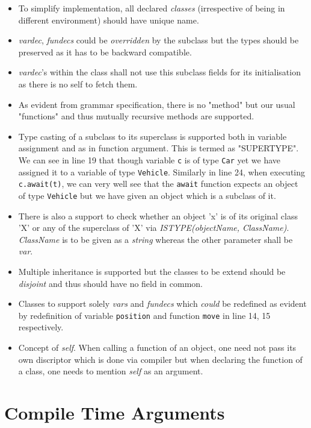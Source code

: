 \begin{itemize}
	\item To simplify implementation, all declared \textit{classes} (irrespective of being in different environment) should have unique name.
	\item \textit{vardec}, \textit{fundecs} could be \textit{overridden} by the subclass but the types should be preserved as it has to be backward compatible.
	\item \textit{vardec}'s within the class shall not use this subclass fields for its initialisation as there is no self to fetch them.
	\item As evident from grammar specification, there is no "method" but our usual "functions" and thus mutually recursive methods are supported.
	\item Type casting of a subclass to its superclass is supported both in variable assignment and as in function argument. This is termed as "SUPERTYPE". We can see in line 19 that though variable \texttt{c} is of type \texttt{Car} yet we have assigned it to a variable of type \texttt{Vehicle}. Similarly in line 24, when executing \texttt{c.await(t)}, we can very well see that the \texttt{await} function expects an object of type \texttt{Vehicle} but we have given an object which is a subclass of it.
	\item There is also a support to check whether an object 'x' is of its original class 'X' or any of the superclass of 'X' via \textit{ISTYPE(objectName, ClassName)}. \textit{ClassName} is to be given as a \textit{string} whereas the other parameter shall be \textit{var}.
	\item Multiple inheritance is supported but the classes to be extend should be \textit{disjoint} and thus should have no field in common.
	\item Classes to support solely \textit{vars} and \textit{fundecs} which \textit{could} be redefined as evident by redefinition of variable \texttt{position} and function \texttt{move} in line 14, 15 respectively.
	\item Concept of \textit{self}. When calling a function of an object, one need not pass its own discriptor which is done via compiler but when declaring the function of a class, one needs to mention \textit{self} as an argument.
\end{itemize}


\section{Compile Time Arguments}

